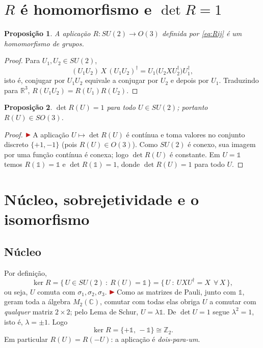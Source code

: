 \documentclass[12pt,a4paper]{article}
\newcommand{\marcador}{\ensuremath{\color{corDestaque}\blacktriangleright}\,}
\newcommand{\add}[1]{{\marcador\color{corDestaque}#1}}
\newcommand{\C}{\mathbb{C}}
\newcommand{\R}{\mathbb{R}}
\newcommand{\Z}{\mathbb{Z}}
\newcommand{\id}{\mathbb{1}}                 %
\newcommand{\dg}{\dagger}
\theoremstyle{definition}
\theoremstyle{plain}
\newtheorem{proposicao}{Proposição}
\theoremstyle{remark}
\begin{document}
\section{$R$ é homomorfismo e $\det R=1$}\label{sec:hom}

\begin{proposicao}
A aplicação $R:SU(2)\to O(3)$ definida por \eqref{eq:Rij} é um
homomorfismo de grupos.
\end{proposicao}
\begin{proof}
Para $U_1,U_2\in SU(2)$,
\[
  (U_1U_2)\,X\,(U_1U_2)^{\dg}=U_1\bigl(U_2 X U_2^{\dg}\bigr)U_1^{\dg},
\]
isto é, conjugar por $U_1U_2$ equivale a conjugar por $U_2$ e depois por
$U_1$. Traduzindo para $\R^3$, $R(U_1U_2)=R(U_1)R(U_2)$.
\end{proof}

\begin{proposicao}
$\det R(U)=1$ para todo $U\in SU(2)$; portanto $R(U)\in SO(3)$.
\end{proposicao}
\begin{proof}
\add{A aplicação $U\mapsto\det R(U)$ é contínua e toma valores no conjunto
discreto $\{+1,-1\}$ (pois $R(U)\in O(3)$). Como $SU(2)$ é conexo, sua
imagem por uma função contínua é conexa; logo $\det R(U)$ é constante. Em
$U=\id$ temos $R(\id)=\id$ e $\det R(\id)=1$, donde $\det R(U)=1$ para
todo $U$.}
\end{proof}

\section{Núcleo, sobrejetividade e o isomorfismo}

\subsection*{Núcleo}
Por definição,
\[
  \ker R=\{\,U\in SU(2)\ :\ R(U)=\id\,\}
        =\{\,U\ :\ UXU^{\dg}=X\ \ \forall\,X\,\},
\]
ou seja, $U$ comuta com $\sigma_1,\sigma_2,\sigma_3$.
\add{Como as matrizes de Pauli, junto com $\id$, geram toda a álgebra
$M_2(\C)$, comutar com todas elas obriga $U$ a comutar com \emph{qualquer}
matriz $2\times2$; pelo Lema de Schur, $U=\lambda\id$.} De $\det U=1$ segue
$\lambda^2=1$, isto é, $\lambda=\pm1$. Logo
\begin{equation}\label{eq:kernel}
  \ker R=\{+\id,\,-\id\}\cong\Z_2 .
\end{equation}
Em particular $R(U)=R(-U)$: a aplicação é \emph{dois-para-um}.
\end{document}

